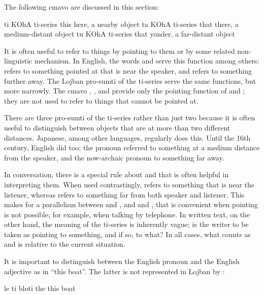 The following cmavo are discussed in this section:

   ti  KOhA    ti-series   this here,
                    a nearby object
    ta  KOhA    ti-series   that there,
                    a medium-distant object
    tu  KOhA    ti-series   that yonder,
                    a far-distant object

It is often useful to refer to things by pointing to them or by
    some related non-linguistic mechanism. In English, the words
     and  serve this function among others:
     refers to something pointed at that is near the
    speaker, and  refers to something further away. The
    Lojban pro-sumti of the ti-series serve the same functions, but
    more narrowly. The cmavo , , and  provide
    only the pointing function of  and ; they are
    not used to refer to things that cannot be pointed at. 

There are three pro-sumti of the ti-series rather than just
    two because it is often useful to distinguish between objects
    that are at more than two different distances. Japanese, among
    other languages, regularly does this. Until the 16th century,
    English did too; the pronoun  referred to something at
    a medium distance from the speaker, and the now-archaic pronoun
     to something far away.

In conversation, there is a special rule about  and
     that is often helpful in interpreting them. When used
    contrastingly,  refers to something that is near the
    listener, whereas  refers to something far from both
    speaker and listener. This makes for a parallelism between
     and , and  and , that is convenient
    when pointing is not possible; for example, when talking by
    telephone. In written text, on the other hand, the meaning of
    the ti-series is inherently vague; is the writer to be taken as
    pointing to something, and if so, to what? In all cases, what
    counts as  and  is relative to the current
    situation.

It is important to distinguish between the English pronoun
     and the English adjective  as in ``this
    boat''. The latter is not represented in Lojban by :
\begin{example}
le ti bloti\n
the this boat
\end{example}

